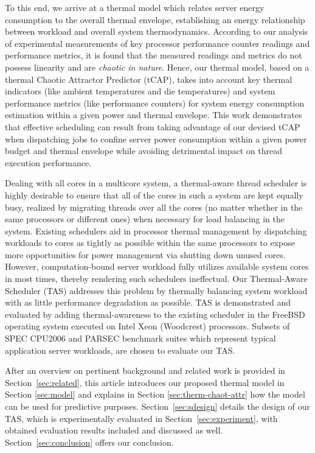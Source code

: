 \documentclass[times, 10pt,twocolumn]{IEEEtran}
\begin{document}
To this end, we arrive at a thermal model which relates server energy consumption to the overall thermal envelope,
establishing an energy relationship between workload and
overall system thermodynamics.
According to our analysis of experimental measurements of
key processor performance counter readings and performance 
metrics, it is found that the measured readings and metrics
do not possess linearity and are \textit{chaotic in nature}.
Hence, our thermal model, based on a thermal Chaotic Attractor Predictor (tCAP),
takes into account key thermal indicators
(like ambient temperatures and die temperatures)
and system performance metrics (like performance counters)
for system energy consumption estimation within a given power and
thermal envelope.
This work demonstrates that effective scheduling can
result from taking advantage of our devised tCAP
when dispatching jobs to confine server power consumption
within a given power budget and thermal envelope while
avoiding detrimental impact on thread execution performance.

Dealing with all cores in a multicore system, a thermal-aware thread
scheduler is highly desirable to ensure that all of the cores in such a
system are kept equally busy, realized by migrating threads over all the
cores (no matter whether in the same processors or different ones) when
necessary for load balancing in the system.  Existing schedulers aid in
processor thermal management by dispatching workloads to cores as
tightly as possible within the same processors to expose more
opportunities for power management via shutting down unused cores.
However, computation-bound server workload fully utilizes available
system cores in most times, thereby rendering such schedulers
ineffectual.  Our Thermal-Aware Scheduler (TAS) addresses this problem
by thermally balancing system workload with as little performance
degradation as possible.  TAS is demonstrated and evaluated by adding
thermal-awareness to the existing scheduler in the FreeBSD operating
system executed on Intel Xeon (Woodcrest) processors.  Subsets of SPEC
CPU2006 and PARSEC benchmark suites which represent typical application
server workloads, are chosen to evaluate our TAS.

After an overview on pertinent background and related work is provided
in Section~\ref{sec:related}, this article introduces our proposed
thermal model in Section \ref{sec:model} and explains in Section
\ref{sec:therm-chaot-attr} how the model can be used for predictive
purposes.  Section~\ref{sec:sdesign} details the design of our TAS,
which is experimentally evaluated in Section~\ref{sec:experiment}, with
obtained evaluation results included and discussed as well.
Section~\ref{sec:conclusion} offers our conclusion.
\end{document}
